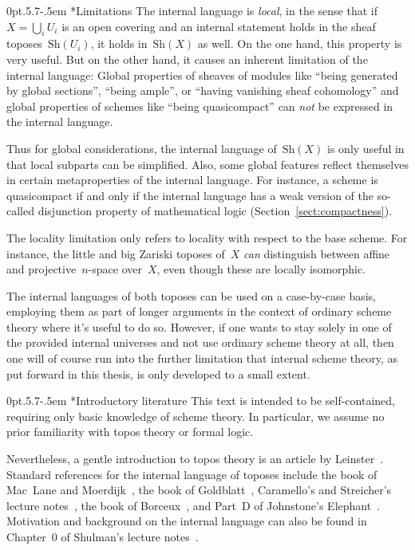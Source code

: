 \documentclass[10pt,reqno,a4paper]{amsbook}
\makeatletter
\theoremstyle{definition}
\theoremstyle{plain}
\theoremstyle{remark}
\newcommand{\Sh}{\mathrm{Sh}}
\newcommand{\?}{\,{:}\,}
\renewcommand{\_}{\mathpunct{.}\,}
\def\subsection{\@startsection{subsection}{2}%
  {0pt}{.5\linespacing\@plus.7\linespacing}{-.5em}%
  {\normalfont\bfseries}}
\makeatother
\begin{document}
{\subsection*{Limitations} The internal language is \emph{local}, in the sense
that if~$X = \bigcup_i U_i$ is an open covering and an internal statement
holds in the sheaf toposes~$\Sh(U_i)$, it holds in~$\Sh(X)$ as well. On the one
hand, this property is very useful. But on the other hand, it causes an inherent
limitation of the internal language:
Global properties of sheaves of modules like ``being generated by global
sections'', ``being ample'', or ``having vanishing sheaf cohomology'' and global properties of schemes like ``being
quasicompact'' can \emph{not} be
expressed in the internal language.

Thus for global considerations, the internal language of~$\Sh(X)$ is only
useful in that local subparts can be simplified. Also, some global features
reflect themselves in certain metaproperties of the internal language. For
instance, a scheme is quasicompact if and only if the internal language
has a weak version of the so-called disjunction property of mathematical
logic (Section~\ref{sect:compactness}).

The locality limitation only refers to locality with respect to the base
scheme. For instance, the little and big Zariski toposes of~$X$ \emph{can}
distinguish between affine and projective~$n$-space over~$X$, even though these
are locally isomorphic.

The internal languages of both toposes can be used on a case-by-case
basis, employing them as part of longer arguments in the context of ordinary scheme
theory where it's useful to do so. However, if one wants to stay solely in one
of the provided internal universes and not use ordinary scheme theory at all,
then one will of course run into the further limitation that internal scheme
theory, as put forward in this thesis, is only developed to a small extent.


\subsection*{Introductory literature} This text is intended
to be self-contained, requiring only basic knowledge of scheme theory. In
particular, we assume no prior familiarity with topos theory or formal logic.

Nevertheless, a gentle
introduction to topos theory is an article by
Leinster~\cite{leinster:introduction}. Standard references for the internal
language of toposes include the book of Mac~Lane and
Moerdijk~\cite[Chapter~VI]{moerdijk-maclane:sheaves-logic}, the book of
Goldblatt~\cite[Chapter~14]{goldblatt:topoi}, Caramello's and Streicher's lecture
notes~\cite{caramello:preliminaries,streicher:ctcl}, the book of
Borceux~\cite[Chapter~6]{borceux:handbook3}, and Part~D of
Johnstone's Elephant~\cite{johnstone:elephant}. Motivation and background on
the internal language can also be found in Chapter~0 of Shulman's lecture
notes~\cite{shulman:categorical-logic}.

}
\end{document}

